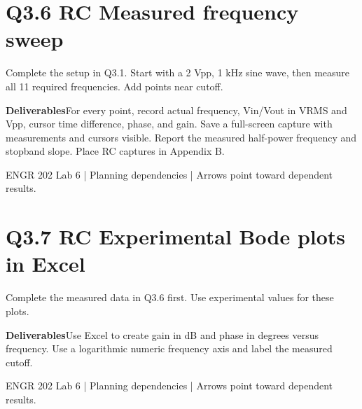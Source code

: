 \documentclass[11pt]{article}
\begin{document}
\section*{Q3.6 RC Measured frequency sweep}
Complete the setup in Q3.1. Start with a 2 Vpp, 1 kHz sine wave, then measure all 11 required frequencies. Add points near cutoff.\par\medskip
\textbf{Deliverables}\quad For every point, record actual frequency, Vin/Vout in VRMS and Vpp, cursor time difference, phase, and gain. Save a full-screen capture with measurements and cursors visible. Report the measured half-power frequency and stopband slope. Place RC captures in Appendix B.\par\bigskip
\begin{center}\end{center}
\vfill\small ENGR 202 Lab 6 | Planning dependencies | Arrows point toward dependent results.
\newpage
\section*{Q3.7 RC Experimental Bode plots in Excel}
Complete the measured data in Q3.6 first. Use experimental values for these plots.\par\medskip
\textbf{Deliverables}\quad Use Excel to create gain in dB and phase in degrees versus frequency. Use a logarithmic numeric frequency axis and label the measured cutoff.\par\bigskip
\begin{center}\end{center}
\vfill\small ENGR 202 Lab 6 | Planning dependencies | Arrows point toward dependent results.
\newpage
\end{document}
